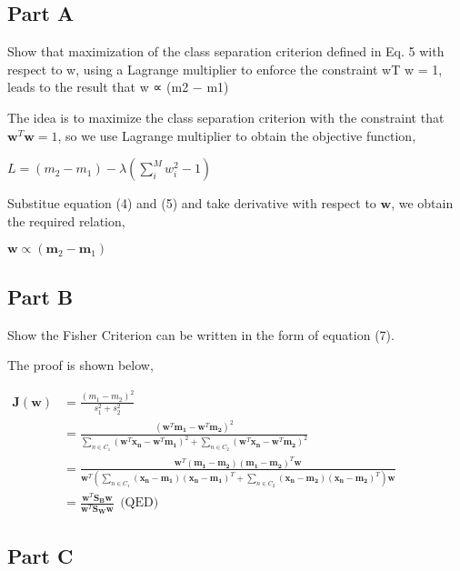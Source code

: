 \documentclass[11pt]{article}
\begin{document}
    \hypertarget{part-a}{%
\subsection{Part A}\label{part-a}}

Show that maximization of the class separation criterion defined in Eq.
5 with respect to w, using a Lagrange multiplier to enforce the
constraint wT w = 1, leads to the result that w ∝ (m2 − m1)

    The idea is to maximize the class separation criterion with the
constraint that \(\mathbf{w}^T\mathbf{w}=1\), so we use Lagrange
multiplier to obtain the objective function,

\(L = (m_2 - m_1) - \lambda(\sum_i^M w_i^2 - 1)\)

Substitue equation (4) and (5) and take derivative with respect to
\(\mathbf{w}\), we obtain the required relation,

\(\mathbf{w} \propto (\mathbf{m}_2 - \mathbf{m}_1)\)

    \hypertarget{part-b}{%
\subsection{Part B}\label{part-b}}

Show the Fisher Criterion can be written in the form of equation (7).

    The proof is shown below,

\(\begin{align}\mathbf{J}(\mathbf{w})&= \frac{(m_1 - m_2)^2}{s_1^2 + s_2^2}\\&= \frac{(\mathbf{w}^T\mathbf{m_1} - \mathbf{w}^T\mathbf{m_2})^2}{\sum_{n\in C_1}(\mathbf{w}^T\mathbf{x_n} - \mathbf{w}^T\mathbf{m_1})^2 + \sum_{n\in C_2}(\mathbf{w}^T\mathbf{x_n} - \mathbf{w}^T\mathbf{m_2})^2}\\ &=\frac{\mathbf{w}^T(\mathbf{m_1}-\mathbf{m_2})(\mathbf{m_1}-\mathbf{m_2})^T\mathbf{w}}{\mathbf{w}^T(\sum_{n\in C_1}(\mathbf{x_n}-\mathbf{m_1})(\mathbf{x_n}-\mathbf{m_1})^T + \sum_{n\in C_2}(\mathbf{x_n}-\mathbf{m_2})(\mathbf{x_n}-\mathbf{m_2})^T)\mathbf{w}}\\ &=\frac{\mathbf{w}^T\mathbf{S_B}\mathbf{w}}{\mathbf{w}^T\mathbf{S_W}\mathbf{w}}\ \ \text{(QED)}\end{align}\)

    \hypertarget{part-c}{%
\subsection{Part C}\label{part-c}}
\end{document}
